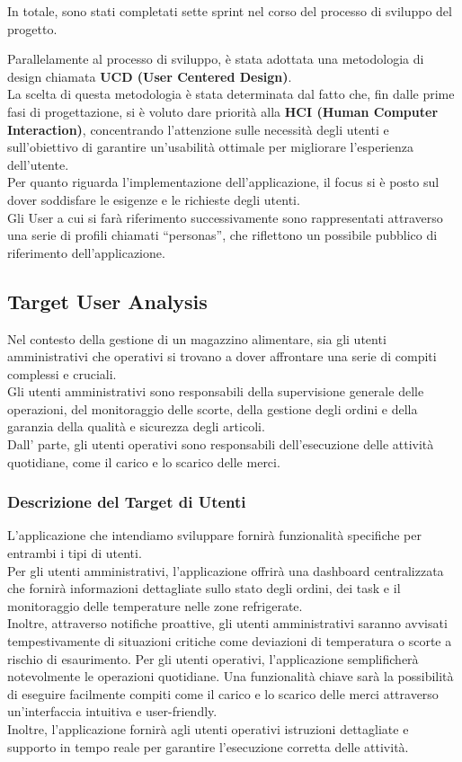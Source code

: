 In totale, sono stati completati sette sprint nel corso del processo di sviluppo del progetto.\vspace{3mm}

Parallelamente al processo di sviluppo, è stata adottata una metodologia di design chiamata \textbf{UCD (User Centered Design)}.\\
La scelta di questa metodologia è stata determinata dal fatto che, fin dalle prime fasi di progettazione,
si è voluto dare priorità alla \textbf{HCI (Human Computer Interaction)}, concentrando l’attenzione sulle necessità
degli utenti e sull’obiettivo di garantire un’usabilità ottimale per migliorare l’esperienza dell’utente.\\
Per quanto riguarda l’implementazione dell’applicazione, il focus si è posto sul dover soddisfare le esigenze e le richieste degli utenti.\\
Gli User a cui si farà riferimento successivamente sono rappresentati attraverso una serie di profili chiamati “personas”, che riflettono un possibile pubblico di riferimento dell’applicazione.
\newpage
\subsection{Target User Analysis}

Nel contesto della gestione di un magazzino alimentare, sia gli utenti amministrativi che operativi si
trovano a dover affrontare una serie di compiti complessi e cruciali.\\ Gli utenti amministrativi sono responsabili
della supervisione generale delle operazioni, del monitoraggio delle scorte, della gestione degli ordini e della
garanzia della qualità e sicurezza degli articoli.\\ Dall' parte, gli utenti operativi sono responsabili dell’esecuzione delle attività quotidiane, come il carico e lo scarico delle merci.

\subsubsection{Descrizione del Target di Utenti}

L'applicazione che intendiamo sviluppare fornirà funzionalità specifiche per entrambi i tipi di utenti.\\
Per gli utenti amministrativi, l’applicazione offrirà una dashboard centralizzata che fornirà informazioni
dettagliate sullo stato degli ordini, dei task e il monitoraggio delle temperature nelle zone refrigerate.\\
Inoltre, attraverso notifiche proattive, gli utenti amministrativi saranno avvisati tempestivamente di situazioni
critiche come deviazioni di temperatura o scorte a rischio di esaurimento. Per gli utenti operativi, l’applicazione
semplificherà notevolmente le operazioni quotidiane. Una funzionalità chiave sarà la possibilità di eseguire facilmente
compiti come il carico e lo scarico delle merci attraverso un’interfaccia intuitiva e user-friendly.\\
Inoltre, l’applicazione fornirà agli utenti operativi istruzioni dettagliate e supporto in tempo reale per garantire l’esecuzione corretta delle attività.

